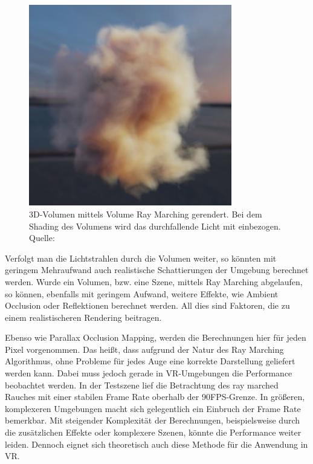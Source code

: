 \begin{figure}[h!]
	\includegraphics[width=0.79\textwidth]{Grafiken/Evaluation/raymarch/Smokeball.JPG}
	\centering
	\begin{footnotesize}
		\caption{3D-Volumen mittels Volume Ray Marching gerendert. Bei dem Shading des Volumens wird das durchfallende Licht mit einbezogen. Quelle: \parencite{Shaderbits:Volume}}
		\label{fig:rayM}
	\end{footnotesize}
\end{figure}


Verfolgt man die Lichtstrahlen durch die Volumen weiter, so könnten mit geringem Mehraufwand auch realistische Schattierungen der Umgebung berechnet werden. 
Wurde ein Volumen, bzw. eine Szene, mittels Ray Marching abgelaufen, so können, ebenfalls mit geringem Aufwand, weitere Effekte, wie 
Ambient Occlusion oder Reflektionen berechnet werden. All dies sind Faktoren, die zu einem realistischeren Rendering beitragen.

Ebenso wie Parallax Occlusion Mapping, werden die Berechnungen hier für jeden Pixel vorgenommen.
Das heißt, dass aufgrund der Natur des Ray Marching Algorithmus, ohne Probleme für jedes Auge eine korrekte Darstellung geliefert werden kann. 
Dabei muss jedoch gerade in VR-Umgebungen die Performance beobachtet werden. 
In der Testszene lief die Betrachtung des ray marched Rauches mit einer stabilen Frame Rate oberhalb der 90FPS-Grenze. In größeren, komplexeren Umgebungen 
macht sich gelegentlich ein Einbruch der Frame Rate bemerkbar. 
Mit steigender Komplexität der Berechnungen, beispielsweise durch die zusätzlichen Effekte oder komplexere Szenen, könnte die Performance weiter leiden. 
Dennoch eignet sich theoretisch auch diese Methode für die Anwendung in VR. 


